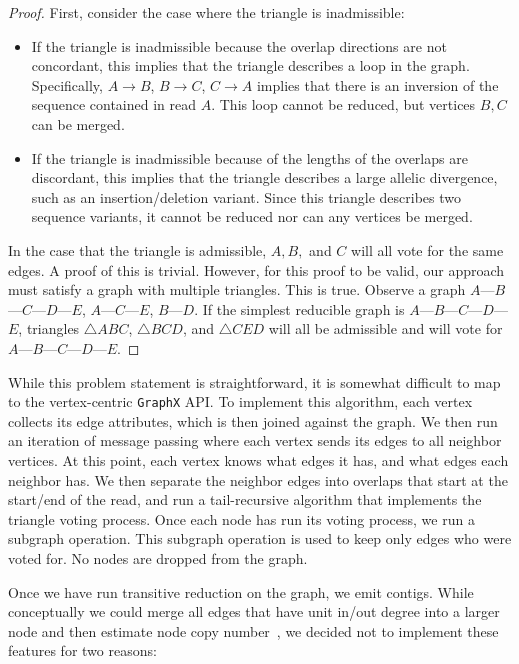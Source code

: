 \documentclass[11pt]{article}
\theoremstyle{plain}
\begin{document}
\begin{proof}
First, consider the case where the triangle is inadmissible:

\begin{itemize}
\item If the triangle is inadmissible because the overlap directions are not concordant,
this implies that the triangle describes a loop in the graph. Specifically, $A \rightarrow
B$, $B \rightarrow C$, $C \rightarrow A$ implies that there is an inversion of the sequence
contained in read $A$. This loop cannot be reduced, but vertices $B, C$ can be merged.
\item If the triangle is inadmissible because of the lengths of the overlaps are discordant,
this implies that the triangle describes a large allelic divergence, such as an insertion/deletion
variant. Since this triangle describes two sequence variants, it cannot be reduced nor can
any vertices be merged.
\end{itemize}

In the case that the triangle is admissible, $A, B,$ and $C$ will all vote for the same edges.
A proof of this is trivial. However, for this proof to be valid, our approach must satisfy a
graph with multiple triangles. This is true. Observe a graph $A$---$B$---$C$---$D$---$E$,
$A$---$C$---$E$, $B$---$D$. If the simplest reducible graph is $A$---$B$---$C$---$D$---$E$,
triangles $\triangle ABC$, $\triangle BCD$, and $\triangle CED$ will all be admissible and will
vote for $A$---$B$---$C$---$D$---$E$.
\end{proof}

While this problem statement is straightforward, it is somewhat difficult to map to the
vertex-centric \texttt{GraphX} API. To implement this algorithm, each vertex collects its
edge attributes, which is then joined against the graph. We then run an iteration of message
passing where each vertex sends its edges to all neighbor vertices. At this point,
each vertex knows what edges it has, and what edges each neighbor has. We then separate the
neighbor edges into overlaps that start at the start/end of the read, and run a tail-recursive
algorithm that implements the triangle voting process. Once each node has run its voting
process, we run a subgraph operation. This subgraph operation is used to keep only edges
who were voted for. No nodes are dropped from the graph.

Once we have run transitive reduction on the graph, we emit contigs. While conceptually we
could merge all edges that have unit in/out degree into a larger node and then estimate
node copy number~\cite{myers05}, we decided not to implement these features for two reasons:
\end{document}
